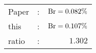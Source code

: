       \begin{tabular}{lcr}
          Paper &:& $\mathrm{Br}  = 0.082\%$ \\
          this      &:& $\mathrm{Br}  = 0.107\%$ \\
		  ratio   &:& $1.302$ \\
      \end{tabular}
